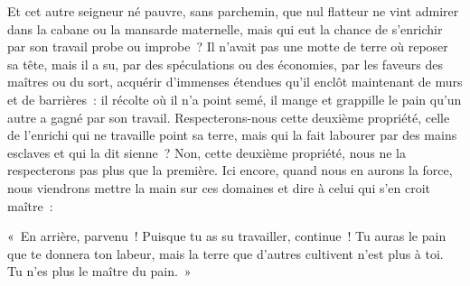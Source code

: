 \documentclass[french,twoside]{book} %
\newenvironment{quoteblock}%
  {\begin{quoting}}
  {\end{quoting}}
\newenvironment{quotebar}{%
    \def\FrameCommand{{\color{rubric!10!}\vrule width 0.5em} \hspace{0.9em}}%
    \def\OuterFrameSep{\itemsep} %
    \MakeFramed {\advance\hsize-\width \FrameRestore}
  }%
  {%
    \endMakeFramed
  }
\renewenvironment{quoteblock}%
  {%
    \savenotes
    \setstretch{0.9}
    \normalfont
    \begin{quotebar}
  }
  {%
    \end{quotebar}
    \spewnotes
  }
\begin{document}
Et cet autre seigneur né pauvre, sans parchemin, que nul flatteur ne vint admirer dans la cabane ou la mansarde maternelle, mais qui eut la chance de s’enrichir par son travail probe ou improbe ? Il n’avait pas une motte de terre où reposer sa tête, mais il a su, par des spéculations ou des économies, par les faveurs des maîtres ou du sort, acquérir d’immenses étendues qu’il enclôt maintenant de murs et de barrières : il récolte où il n’a point semé, il mange et grappille le pain qu’un autre a gagné par son travail. Respecterons-nous cette deuxième propriété, celle de l’enrichi qui ne travaille point  sa terre, mais qui la fait labourer par des mains esclaves et qui la dit sienne ? Non, cette deuxième propriété, nous ne la respecterons pas plus que la première. Ici encore, quand nous en aurons la force, nous viendrons mettre la main sur ces domaines et dire à celui qui s’en croit maître :\par

\begin{quoteblock}
\noindent « En arrière, parvenu ! Puisque tu as su travailler, continue ! Tu auras le pain que te donnera ton labeur, mais la terre que d’autres cultivent n’est plus à toi. Tu n’es plus le maître du pain. »\end{quoteblock}
\end{document}
